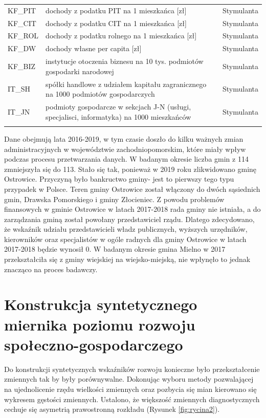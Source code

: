 \documentclass{amuthesis}
\begin{document}
\begin{table}
\begin{tabular}[t]{>{\raggedright\arraybackslash}p{2cm}>{\raggedright\arraybackslash}p{11cm}l}
KF\_PIT & dochody z podatku PIT na 1 mieszkańca [zł] & Stymulanta\\
KF\_CIT & dochody z podatku CIT na 1 mieszkańca [zł] & Stymulanta\\
KF\_ROL & dochody z podatku rolnego na 1 mieszkańca [zł] & Stymulanta\\
\addlinespace
KF\_DW & dochody własne per capita [zł] & Stymulanta\\
KF\_BIZ & instytucje otoczenia biznesu na 10 tys. podmiotów gospodarki narodowej & Stymulanta\\
IT\_SH & spółki handlowe z udziałem kapitału zagranicznego na 1000 podmiotów gospodarczych & Stymulanta\\
IT\_JN & podmioty gospodarcze w sekcjach J-N (usługi, specjalisci, informatyka) na 1000 mieszkańców & Stymulanta\\
\bottomrule
\multicolumn{3}{l}{\textsuperscript{*} Zródło: Opracowanie własne}\\
\end{tabular}
\end{table}

Dane obejmują lata 2016-2019, w tym czasie doszło do kilku ważnych zmian administracyjnych w województwie zachodniopomorskim, które miały wpływ podczas procesu przetwarzania danych.
W badanym okresie liczba gmin z 114 zmniejszyła się do 113.
Stało się tak, ponieważ w 2019 roku zlikwidowano gminę Ostrowice.
Przyczyną było bankructwo gminy- jest to pierwszy tego typu przypadek w Polsce.
Teren gminy Ostrowice został włączony do dwóch sąsiednich gmin, Drawska Pomorskiego i gminy Złocieniec.\autocite{ostrowice}
Z powodu problemów finansowych w gminie Ostrowice w latach 2017-2018 rada gminy nie istniała, a do zarządzania gminą został powołany przedstawiciel rządu.
Dlatego zdecydowano, że wskaźnik udziału przedstawicieli władz publicznych, wyższych urzędników, kierowników oraz specjalistów w ogóle radnych dla gminy Ostrowice w latach 2017-2018 będzie wynosił 0.
W badanym okresie gmina Mielno w 2017 przekształciła się z gminy wiejskiej na wiejsko-miejską, nie wpłynęło to jednak znacząco na proces badawczy.

\hypertarget{wskaznik}{%
\section{Konstrukcja syntetycznego miernika poziomu rozwoju społeczno-gospodarczego}\label{wskaznik}}

Do konstrukcji syntetycznych wskaźników rozwoju konieczne było przekształcenie zmiennych tak by były porównywalne. Dokonując wyboru metody pozwalającej na ujednolicenie rzędu wielkości zmiennych oraz pozbycia się mian kierowano się wykresem gęstości zmiennych. Ustalono, że większość zmiennych diagnostycznych cechuje się asymetrią prawostronną rozkładu (Rysunek \ref{fig:rycina2}).
\end{document}
